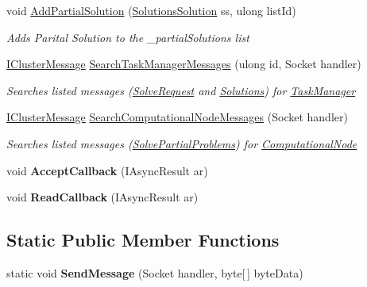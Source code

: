 \begin{DoxyCompactItemize}
void \hyperlink{class_communication_server_1_1_message_dispatcher_a918d6101f88cf8116d6b919b7923bcba}{Add\+Partial\+Solution} (\hyperlink{class_solutions_solution}{Solutions\+Solution} ss, ulong list\+Id)
\begin{DoxyCompactList}\small\item\em Adds Parital Solution to the \+\_\+partial\+Solutions list \end{DoxyCompactList}\item 
\hyperlink{interface_cluster_messages_1_1_i_cluster_message}{I\+Cluster\+Message} \hyperlink{class_communication_server_1_1_message_dispatcher_a20aa92ccb3e90d39e4b659e266004c3c}{Search\+Task\+Manager\+Messages} (ulong id, Socket handler)
\begin{DoxyCompactList}\small\item\em Searches listed messages (\hyperlink{class_solve_request}{Solve\+Request} and \hyperlink{class_solutions}{Solutions}) for \hyperlink{namespace_task_manager}{Task\+Manager} \end{DoxyCompactList}\item 
\hyperlink{interface_cluster_messages_1_1_i_cluster_message}{I\+Cluster\+Message} \hyperlink{class_communication_server_1_1_message_dispatcher_a2164a41ee186aa26fe730826a933ce9b}{Search\+Computational\+Node\+Messages} (Socket handler)
\begin{DoxyCompactList}\small\item\em Searches listed messages (\hyperlink{class_solve_partial_problems}{Solve\+Partial\+Problems}) for \hyperlink{namespace_computational_node}{Computational\+Node} \end{DoxyCompactList}\item 
\hypertarget{class_communication_server_1_1_message_dispatcher_a84feec90f6d26c683cdef194dc6d1ab6}{}void {\bfseries Accept\+Callback} (I\+Async\+Result ar)\label{class_communication_server_1_1_message_dispatcher_a84feec90f6d26c683cdef194dc6d1ab6}

\item 
\hypertarget{class_communication_server_1_1_message_dispatcher_a76d857e8279155a0aeb7790f369ebaef}{}void {\bfseries Read\+Callback} (I\+Async\+Result ar)\label{class_communication_server_1_1_message_dispatcher_a76d857e8279155a0aeb7790f369ebaef}

\end{DoxyCompactItemize}
\subsection*{Static Public Member Functions}
\begin{DoxyCompactItemize}
\item 
\hypertarget{class_communication_server_1_1_message_dispatcher_a2a513401c100e0ce8d4bc658408137d0}{}static void {\bfseries Send\+Message} (Socket handler, byte\mbox{[}$\,$\mbox{]} byte\+Data)\label{class_communication_server_1_1_message_dispatcher_a2a513401c100e0ce8d4bc658408137d0}

\end{DoxyCompactItemize}
